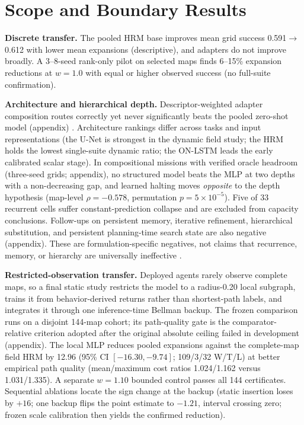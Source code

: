 \documentclass[letterpaper]{article} %
\begin{document}
\section{Scope and Boundary Results}

\textbf{Discrete transfer.} The pooled HRM base improves mean grid success 0.591$\to$0.612 with lower mean expansions (descriptive), and adapters do not improve broadly. A 3--8-seed rank-only pilot on selected maps finds 6--15\% expansion reductions at $w{=}1.0$ with equal or higher observed success (no full-suite confirmation).

\textbf{Architecture and hierarchical depth.} Descriptor-weighted adapter composition routes correctly yet never significantly beats the pooled zero-shot model (appendix) \citep{wortsman2022soups,ilharco2022task}. Architecture rankings differ across tasks and input representations (the U-Net is strongest in the dynamic field study; the HRM holds the lowest single-suite dynamic ratio; the ON-LSTM leads the early calibrated scalar stage). In compositional missions with verified oracle headroom (three-seed grids; appendix), no structured model beats the MLP at two depths with a non-decreasing gap, and learned halting moves \emph{opposite} to the depth hypothesis (map-level $\rho{=}-0.578$, permutation $p{=}5\times10^{-5}$). Five of 33 recurrent cells suffer constant-prediction collapse and are excluded from capacity conclusions. Follow-ups on persistent memory, iterative refinement, hierarchical substitution, and persistent planning-time search state are also negative (appendix). These are formulation-specific negatives, not claims that recurrence, memory, or hierarchy are universally ineffective \citep{jolicoeur2025trm,czechowski2021subgoal}.

\textbf{Restricted-observation transfer.} Deployed agents rarely observe complete maps, so a final static study restricts the model to a radius-0.20 local subgraph, trains it from behavior-derived returns rather than shortest-path labels, and integrates it through one inference-time Bellman backup. The frozen comparison runs on a disjoint 144-map cohort; its path-quality gate is the comparator-relative criterion adopted after the original absolute ceiling failed in development (appendix). The local MLP reduces pooled expansions against the complete-map field HRM by 12.96 (95\% CI $[-16.30,-9.74]$; 109/3/32 W/T/L) at better empirical path quality (mean/maximum cost ratios 1.024/1.162 versus 1.031/1.335). A separate $w{=}1.10$ bounded control passes all 144 certificates. Sequential ablations locate the sign change at the backup (static insertion loses by $+16$; one backup flips the point estimate to $-1.21$, interval crossing zero; frozen scale calibration then yields the confirmed reduction).
\end{document}
